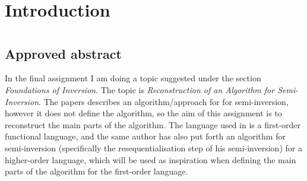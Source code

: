 


\section{Introduction}


\newpage 

\printbibliography

\newpage
\appendix
\section{}
\subsection{Approved abstract}
In the final assignment I am doing a topic suggested under the section \textit{Foundations of Inversion}. The topic is \textit{Reconstruction of an Algorithm for Semi-Inversion}. The papers \cite{Guarded, implementation} describes an algorithm/approach for for semi-inversion, however it does not define the algorithm, so the aim of this assignment is to reconstruct the main parts of the algorithm. The language used in \cite{Guarded, implementation} is a first-order functional language, and the same author has also put forth an algorithm for semi-inversion (specifically the resequentialisation step of his semi-inversion) \cite{PEPM-2008-Mogensen} for a higher-order language, which will be used as inspiration when defining the main parts of the algorithm for the first-order language.

